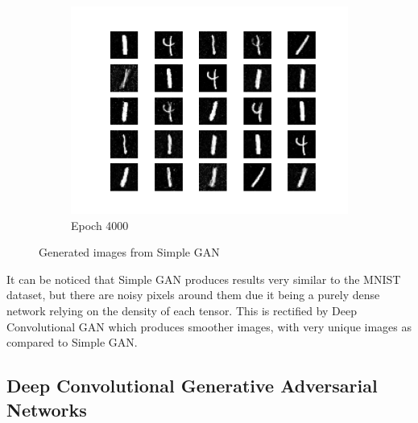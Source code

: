 \documentclass[conference]{IEEEtran}
\begin{document}
\begin{figure}[htbp]
\begin{subfigure}[b]{\columnwidth}
         \centering
         \includegraphics[width=\textwidth,keepaspectratio]{GAN_4000.png}
         \caption{Epoch 4000}
         \label{fig:gan4000}
     \end{subfigure}
        \caption{Generated images from Simple GAN}
        \label{fig:gan_out}
\end{figure}

It can be noticed that Simple GAN produces results very similar to the MNIST dataset, but there are noisy pixels around them due it being a purely dense network relying on the density of each tensor. This is rectified by Deep Convolutional GAN which produces smoother images, with very unique images as compared to Simple GAN.

\subsection{Deep Convolutional Generative Adversarial Networks}\label{dcgan_results}
\end{document}
